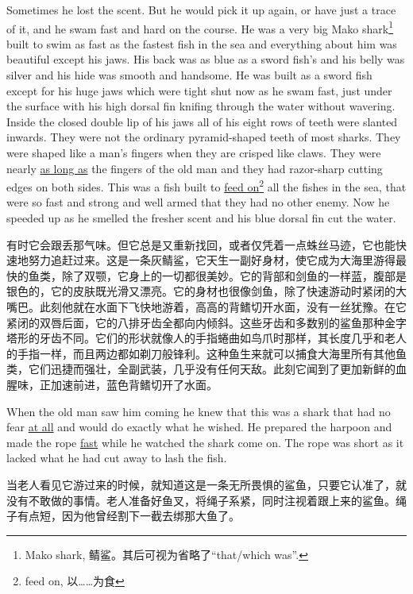 \begin{paracol}{2}
Sometimes he lost the scent. But he would pick it up again, or have just a
\gls{trace} of it, and he swam fast and hard on the course. He was a very
big Mako shark\footnote{Mako shark, 鲭鲨。其后可视为省略了``that/which
  was''.} built to swim as fast as the fastest fish in the sea and
everything about him was beautiful except his jaws. His back was as blue as
a sword fish's and his belly was silver and his hide was smooth and
handsome. He was built as a sword fish except for his huge jaws which were
tight shut now as he swam fast, just under the surface with his high dorsal
fin \gls{knifing} through the water without wavering. Inside the closed
double lip of his jaws all of his eight rows of teeth were slanted
\gls{inwards}. They were not the \gls{ordinary} \gls{pyramid}-shaped teeth
of most sharks. They were shaped like a man's fingers when they are
\gls{crisped} like claws. They were nearly \uline{as long as} the fingers of the old
man and they had \gls{razor}-sharp cutting edges on both sides. This was a
fish built to \uline{feed on}\footnote{feed on, 以……为食} all the fishes
in the sea, that were so fast and strong and well armed that they had no
other enemy. Now he speeded up as he smelled the fresher scent and his blue
dorsal fin cut the water.

\switchcolumn

有时它会跟丢那气味。但它总是又重新找回，或者仅凭着一点蛛丝马迹，它也能快速地努力追赶过来。这是一条灰鲭鲨，它天生一副好身材，使它成为大海里游得最快的鱼类，除了双颚，它身上的一切都很美妙。它的背部和剑鱼的一样蓝，腹部是银色的，它的皮肤既光滑又漂亮。它的身材也很像剑鱼，除了快速游动时紧闭的大嘴巴。此刻他就在水面下飞快地游着，高高的背鳍切开水面，没有一丝犹豫。在它紧闭的双唇后面，它的八排牙齿全都向内倾斜。这些牙齿和多数别的鲨鱼那种金字塔形的牙齿不同。它们的形状就像人的手指蜷曲如鸟爪时那样，其长度几乎和老人的手指一样，而且两边都如剃刀般锋利。这种鱼生来就可以捕食大海里所有其他鱼类，它们迅捷而强壮，全副武装，几乎没有任何天敌。此刻它闻到了更加新鲜的血腥味，正加速前进，蓝色背鳍切开了水面。

\switchcolumn*

When the old man saw him coming he knew that this was a shark that had no
fear \uline{at all} and would do exactly what he wished. He prepared the harpoon and
made the rope \uline{fast} while he watched the shark come on. The rope was short as
it lacked what he had cut away to lash the fish.

\switchcolumn

当老人看见它游过来的时候，就知道这是一条无所畏惧的鲨鱼，只要它认准了，就没有不敢做的事情。老人准备好鱼叉，将绳子系紧，同时注视着跟上来的鲨鱼。绳子有点短，因为他曾经割下一截去绑那大鱼了。


\end{paracol}
